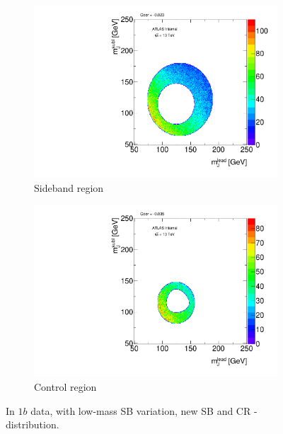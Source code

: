 \begin{figure}[htbp!]
\centering
\captionsetup{justification=centering}
    \begin{subfigure}[b]{0.45\textwidth}
        \includegraphics[width=\textwidth,angle=-90]{figures/boosted/Syst_CRSB/SB_Low_Sideband_OneTag_mH0H1.pdf}
        \caption{Sideband region}
        \label{CRSB:SB_Low_SB}
    \end{subfigure}
    \quad
    \begin{subfigure}[b]{0.45\textwidth}
        \includegraphics[width=\textwidth,angle=-90]{figures/boosted/Syst_CRSB/SB_Low_Control_OneTag_mH0H1.pdf}
        \caption{Control region}
        \label{CRSB:SB_Low_CR}
    \end{subfigure}
\caption{In $1b$ data, with low-mass SB variation, new SB and CR \mleadJ-\msublJ distribution.}
\label{CRSB:SB_Low}
\end{figure}


